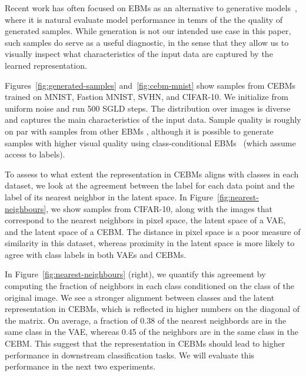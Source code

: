\documentclass{article}
\begin{document}
Recent work has often focused on EBMs as an alternative to generative models~\cite{du2019implicit, nijkamp2019anatomy}, where it is natural evaluate model performance in temrs of the the quality of generated samples. While generation is not our intended use case in this paper, such samples do serve as a useful diagnostic, in the sense that they allow us to visually inspect what characteristics of the input data are captured by the learned representation. 

Figures~\ref{fig:generated-samples} and~\ref{fig:cebm-mnist} show samples from CEBMs trained on MNIST, Fastion MNIST, SVHN, and CIFAR-10. We initialize from uniform noise and run 500 SGLD steps. The distribution over images is diverse and captures the main characteristics of the input data. Sample quality is roughly on par with samples from other EBMs \cite{nijkamp2019anatomy}, although it is possible to generate samples with higher visual quality using class-conditional EBMs~\cite{du2019implicit, grathwohl2019your, liu2020hybrid} (which assume access to labels).


To assess to what extent the representation in CEBMs aligns with classes in each dataset, we look at the agreement between the label for each data point and the label of its nearest neighbor in the latent space. In Figure~\ref{fig:nearest-neighbours}, we show samples from CIFAR-10, along with the images that correspond to the nearest neighbors in pixel space, the latent space of a VAE, and the latent space of a CEBM. The distance in pixel space is a poor measure of similarity in this dataset, whereas proximity in the latent space is more likely to agree with class labels in both VAEs and CEBMs. 

In Figure~\ref{fig:nearest-neighbours} (right), we quantify this agreement by computing the fraction of neighbors in each class conditioned on the class of the original image. We see a stronger alignment between classes and the latent representation in CEBMs, which is reflected in higher numbers on the diagonal of the matrix. On average, a fraction of 0.38 of the nearest neighbords are in the same class in the VAE, whereas 0.45 of the neighbors are in the same class in the CEBM. This suggest that the representation in CEBMs should lead to higher performance in downstream classification tasks. We will evaluate this performance in the next two experiments.
\end{document}
